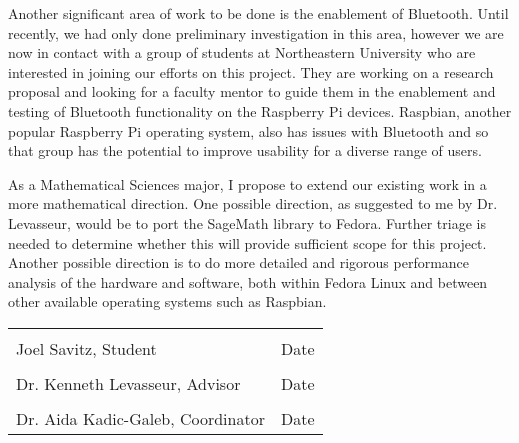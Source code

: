 \documentclass[12pt]{amsart}
\begin{document}
Another significant area of work to be done is the enablement of Bluetooth. Until recently, we had only done preliminary investigation in this area, however we are now in contact with a group of students at Northeastern University who are interested in joining our efforts on this project. They are working on a research proposal and looking for a faculty mentor to guide them in the enablement and testing of Bluetooth functionality on the Raspberry Pi devices. Raspbian, another popular Raspberry Pi operating system, also has issues with Bluetooth and so that group has the potential to improve usability for a diverse range of users.

As a Mathematical Sciences major, I propose to extend our existing work in a more mathematical direction. One possible direction, as suggested to me by Dr. Levasseur, would be to port the SageMath library to Fedora. Further triage is needed to determine whether this will provide sufficient scope for this project. Another possible direction is to do more detailed and rigorous performance analysis of the hardware and software, both within Fedora Linux and between other available operating systems such as Raspbian.

\noindent\begin{tabular}{ll}
	\\[4ex]
	\makebox[4in]{\hrulefill} & \makebox[1.5in]{\hrulefill} \\
	Joel Savitz, Student & Date \\[4ex]
	\makebox[4in]{\hrulefill} & \makebox[1.5in]{\hrulefill} \\
	Dr. Kenneth Levasseur, Advisor & Date \\[4ex]
	\makebox[4in]{\hrulefill} & \makebox[1.5in]{\hrulefill} \\
	Dr. Aida Kadic-Galeb, Coordinator & Date \\[4ex]
\end{tabular}
\end{document}
